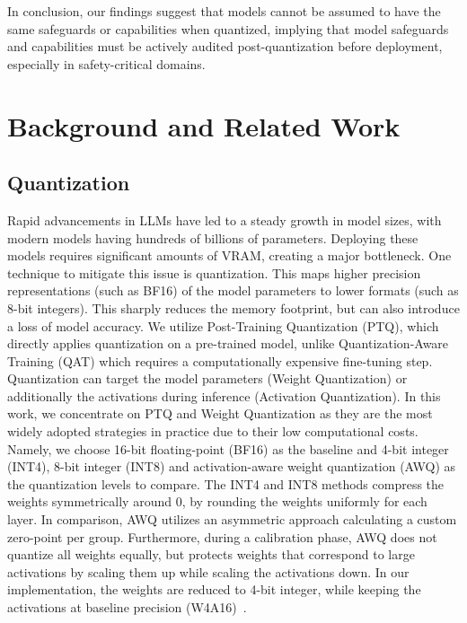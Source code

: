\documentclass{article}
\begin{document}
In conclusion, our findings suggest that models cannot be assumed to have the same safeguards or capabilities when quantized, 
implying that model safeguards and capabilities must be actively audited post-quantization before deployment, especially in safety-critical domains.

\section{Background and Related Work}

\subsection{Quantization}
Rapid advancements in LLMs have led to a steady growth in model sizes, with modern models having hundreds of billions of parameters. Deploying these models requires significant amounts of VRAM, creating a major bottleneck. One technique to mitigate this issue is quantization. 
This maps higher precision representations (such as BF16) of the model parameters to lower formats (such as 8-bit integers). This sharply reduces the memory footprint, but can also introduce a loss of model accuracy.
We utilize Post-Training Quantization (PTQ), which directly applies quantization on a pre-trained model, unlike Quantization-Aware Training (QAT) which requires a computationally expensive fine-tuning step.
Quantization can target the model parameters (Weight Quantization) or additionally the activations during inference (Activation Quantization). In this work, we concentrate on PTQ and Weight Quantization as they are the most widely adopted strategies in practice due to their low computational costs.
Namely, we choose 16-bit floating-point (BF16) as the baseline and 4-bit integer (INT4), 8-bit integer (INT8) and activation-aware weight quantization (AWQ) as the quantization levels to compare. The INT4 and INT8 methods compress the weights symmetrically around 0, by rounding the weights uniformly for each layer. 
In comparison, AWQ utilizes an asymmetric approach calculating a custom zero-point per group. Furthermore, during a calibration phase, AWQ does not quantize all weights equally, but protects weights that correspond to large activations by scaling them up while scaling the activations down. 
In our implementation, the weights are reduced to 4-bit integer, while keeping the activations at baseline precision (W4A16)~\cite{lin2026awqactivationawareweightquantization}.
\end{document}
